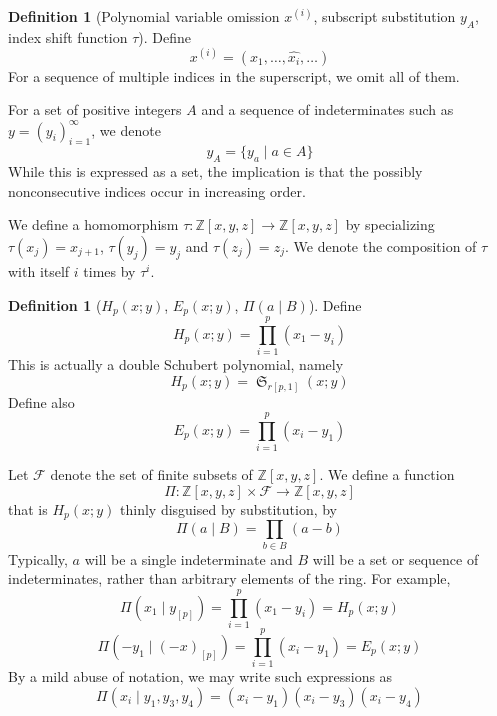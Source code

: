 \documentclass[reqno]{amsart}
\theoremstyle{definition}
\newtheorem{definition}[lemma]{Definition}
\theoremstyle{remark}
\numberwithin{equation}{subsection}
\DeclareMathOperator{\sch}{\mathfrak{S}}
\newcommand{\smpfu}{\mathsf{\Pi}}
\newcommand{\smpre}[2]{\ensuremath{}\smpfu\left( #1 \mid #2\right)}
\newcommand{\shifthom}{\tau}
\newcommand{\shiftvby}[1]{\shifthom^{#1}}
\begin{document}
	
	
	
	
	
	
	
	
	
	\begin{definition}[Polynomial variable omission $x^{(i)}$, subscript substitution $y_A$, index shift function $\shifthom$] \label{definition:pv}
		Define
		$$x^{(i)}=(x_1,\ldots,\widehat{x_i},\ldots)$$
		For a sequence of multiple indices in the superscript, we omit all of them. 
		
		For a set of positive integers $A$ and a sequence of indeterminates such as $y = (y_i)_{i=1}^{\infty}$, we denote 
		$$y_A = \{y_a\mid a\in A\}$$
		While this is expressed as a set, the implication is that the possibly nonconsecutive indices occur in increasing order.
		
		We define a homomorphism $\shifthom:\mathbb{Z}[x,y,z]\to\mathbb{Z}[x,y,z]$ by specializing $\shifthom(x_j)=x_{j+1}$, $\shifthom(y_j)=y_j$ and $\shifthom(z_j)=z_j$. We denote the composition of $\shifthom$ with itself $i$ times by $\shiftvby{i}$.
		
	\end{definition}
	
	\begin{definition}[$H_p(x;y)$, $E_p(x;y)$, $\smpre{a}{B}$] \label{definition:hp}
		Define 
		$$H_p(x;y)=\prod_{i=1}^p (x_1-y_i)$$
		This is actually a double Schubert polynomial, namely
		$$H_p(x;y)=\sch_{r[p,1]}(x;y)$$
		Define also
		$$E_p(x;y)=\prod_{i=1}^p (x_i-y_1)$$
		
		Let $\mathcal{F}$ denote the set of finite subsets of $\mathbb{Z}[x,y,z]$. We define a function 
		$$\smpfu:\mathbb{Z}[x,y,z]\times \mathcal{F}\to\mathbb{Z}[x,y,z]$$
		that is $H_p(x;y)$ thinly disguised by substitution, by
		$$\smpre{a}{B} = \prod_{b\in B}(a-b)$$
		Typically, $a$ will be a single indeterminate and $B$ will be a set or sequence of indeterminates, rather than arbitrary elements of the ring. For example,
		$$\smpre{x_1}{y_{[p]}} = \prod_{i=1}^p(x_1-y_i) = H_p(x;y)$$
		$$\smpre{-y_1}{(-x)_{[p]}} = \prod_{i=1}^p(x_i-y_1) = E_p(x;y)$$
		By a mild abuse of notation, we may write such expressions as
		$$\smpre{x_i}{y_1,y_3,y_4} = (x_i-y_1)(x_i-y_3)(x_i-y_4)$$
		
	\end{definition}
	
\end{document}
